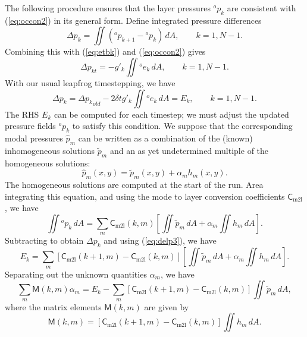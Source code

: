 \documentclass[11pt, a4paper,twoside]{article}
\newcommand{\p}[2]{{{}^{#1}p_{#2}}}
\newcommand{\e}[2]{{{}^{#1}e_{#2}}}
\newcommand{\vc}[1]{\mathbf{#1}}
\newcommand{\mtx}[1]{\vc{\mathsf{#1}}}
\newcommand{\cml}[0]{\mtx{C}_{\mathrm{m2l}}}
\numberwithin{equation}{section}
\begin{document}
The following procedure ensures that the layer pressures $\p{o}{k}$ are consistent with (\ref{eq:occon2}) in its general form.
Define integrated pressure differences
\begin{equation}
\label{eq:delp1}
\Delta p_k = \iint \left(\p{o}{k+1} - \p{o}{k} \right) \, dA, \quad \quad k=1,N-1.
\end{equation}
Combining this with (\ref{eq:etbk}) and (\ref{eq:occon2}) gives
\begin{equation}
\label{eq:delp2}
\Delta p_{kt} = -g'_k  \iint \e{o}{k} \, dA, \quad \quad k=1,N-1.
\end{equation}
With our usual leapfrog timestepping, we have 
\begin{equation}
\label{eq:delp3}
\Delta p_k = \Delta {p_k}_{old} - 2 \delta t g'_k  \iint \e{o}{k} \, dA = E_k, \quad \quad k=1,N-1.
\end{equation}
The RHS $E_k$ can be computed for each timestep; we must adjust the updated pressure fields $\p{o}{k}$ to satisfy this condition.
We suppose that the corresponding modal pressures $\hat{p}_m$ can be written as a combination of the (known) inhomogeneous solutions $\tilde{p}_m$ and an as yet undetermined multiple of the homogeneous solutions:
\begin{equation}
\label{eq:phat1}
\hat{p}_m(x,y) = \tilde{p}_m(x,y) + \alpha_m h_m(x,y).
\end{equation}
The homogeneous solutions are computed at the start of the run.
Area integrating this equation, and using the mode to layer conversion coefficients $\cml$, we have
\begin{equation}
\label{eq:pok1}
\iint \p{o}{k} \, dA = \sum_m \cml(k,m) \left[ \iint \tilde{p}_m \, dA + \alpha_m \iint h_m \, dA \right].
\end{equation}
Subtracting to obtain $\Delta p_k$ and using (\ref{eq:delp3}), we have 
\begin{equation}
\label{eq:pok2}
E_k = \sum_m \left[ \cml(k+1,m) - \cml(k,m)\right] \left[ \iint \tilde{p}_m \, dA + \alpha_m \iint h_m \, dA \right].
\end{equation}
Separating out the unknown quantities $\alpha_m$, we have
\begin{equation}
\label{eq:pok3}
 \sum_m \mathsf M(k,m)\alpha_m = E_k - \sum_m \left[ \cml(k+1,m) - \cml(k,m)\right] \iint \tilde{p}_m \, dA ,
\end{equation}
where the matrix elements $\mathsf M(k,m)$ are given by
\[\mathsf{M}(k,m) =\left[ \cml(k+1,m) - \cml(k,m)\right] \iint h_m \, dA.\]
\end{document}
